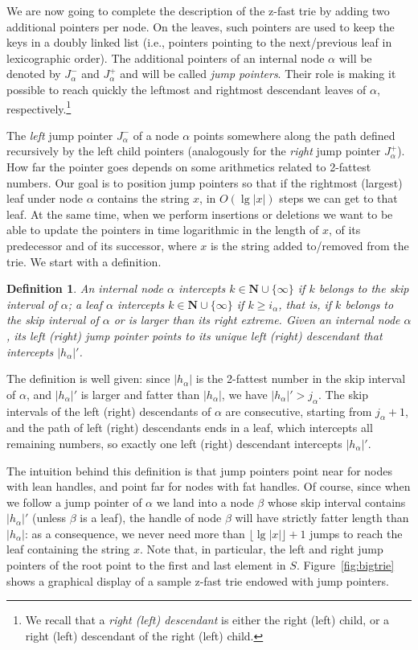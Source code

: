 \documentclass[a4paper]{article}
\newtheorem{definition}{Definition}
\newcommand{\?}{\mskip1.5mu}
\newcommand{\sing}[1]{\{\!#1\!\}}
\begin{document}
We are now going to complete the description of the z-fast trie by adding  
two additional pointers per node. On the leaves, such pointers are used to 
keep the keys in a doubly linked list (i.e., pointers pointing to the next/previous leaf in lexicographic
order). The additional pointers of an internal node $\alpha$ will be
denoted by $J_\alpha^-$ and $J_\alpha^+$ and will be called \emph{jump pointers}.
Their role is making it possible to reach quickly the leftmost and rightmost descendant
leaves of $\alpha$, respectively.\footnote{We recall that a \emph{right (left) descendant} is either the right (left) child,
or a right (left) descendant of the right (left) child.}
 
The \emph{left} jump pointer $J_\alpha^-$ of a node
$\alpha$ points somewhere along the path defined recursively by the left child
pointers (analogously for the \emph{right} jump pointer $J_\alpha^+$). How far the
pointer goes depends on some arithmetics related to 2-fattest numbers. Our goal
is to position jump pointers so that if the rightmost (largest) leaf under node
$\alpha$ contains the string $x$, in $O(\lg|x|)$ steps we can get to that leaf. At
the same time, when we perform insertions or deletions we want to be
able to update the pointers in time logarithmic in the length of $x$, of its predecessor and of its successor, where $x$ is the
string added to/removed from the trie.
We start with a definition.

\begin{definition}
An internal node $\alpha$ \emph{intercepts} $k\in \mathbf N\cup\sing\infty$ if $k$ belongs to the
skip interval of $\alpha$; a leaf $\alpha$ intercepts $k\in \mathbf N\cup\sing\infty$ if $k\geq i_\alpha$, that
is, if $k$ belongs to the skip interval of $\alpha$ or is larger than its right
extreme. Given an internal node $\alpha$, its \emph{left (right) jump pointer}
points to its unique left (right) descendant that intercepts $|h_\alpha|'$.
\end{definition}

The definition is well given: since $|h_\alpha|$ is the 2-fattest number in the skip interval of $\alpha$, and 
$|h_\alpha|'$ is larger and fatter than $|h_\alpha|$, we have $|h_\alpha|'>j_\alpha$. The skip intervals of the left (right) descendants of $\alpha$
are consecutive, starting from $j_\alpha+1$, and the path of left (right) descendants ends in a leaf,
which intercepts all remaining numbers, so exactly one left (right) descendant intercepts $|h_\alpha|'$.

The intuition behind this definition is that jump pointers point near for nodes
with lean handles, and point far for nodes with fat handles. Of course,
since when we follow a jump pointer of $\alpha$ we land into a node $\beta$
whose skip interval contains $|h_\alpha|'$ (unless $\beta$ is a leaf), the handle of node
$\beta$ will have strictly fatter length than $|h_\alpha|$: as a consequence, 
we never need more than $\lfloor\lg|x|\rfloor+1$ jumps to reach the leaf containing the string
$x$. Note that, in particular, the left and right jump pointers of the root 
point to the first and last element in $S$.
Figure~\ref{fig:bigtrie} shows a graphical display of a sample z-fast trie
endowed with jump pointers.
\end{document}
